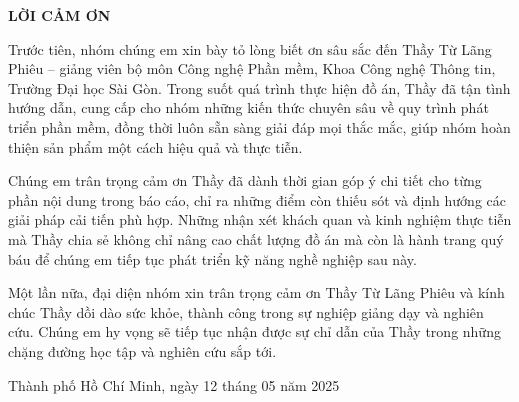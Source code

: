 \documentclass[a4paper]{article}
\begin{document}
\newpage
\begin{center}
\large\textbf{LỜI CẢM ƠN}
\end{center}

Trước tiên, nhóm chúng em xin bày tỏ lòng biết ơn sâu sắc đến Thầy Từ Lãng Phiêu – giảng viên bộ môn Công nghệ Phần mềm, Khoa Công nghệ Thông tin, Trường Đại học Sài Gòn. Trong suốt quá trình thực hiện đồ án, Thầy đã tận tình hướng dẫn, cung cấp cho nhóm những kiến thức chuyên sâu về quy trình phát triển phần mềm, đồng thời luôn sẵn sàng giải đáp mọi thắc mắc, giúp nhóm hoàn thiện sản phẩm một cách hiệu quả và thực tiễn.

Chúng em trân trọng cảm ơn Thầy đã dành thời gian góp ý chi tiết cho từng phần nội dung trong báo cáo, chỉ ra những điểm còn thiếu sót và định hướng các giải pháp cải tiến phù hợp. Những nhận xét khách quan và kinh nghiệm thực tiễn mà Thầy chia sẻ không chỉ nâng cao chất lượng đồ án mà còn là hành trang quý báu để chúng em tiếp tục phát triển kỹ năng nghề nghiệp sau này.

Một lần nữa, đại diện nhóm xin trân trọng cảm ơn Thầy Từ Lãng Phiêu và kính chúc Thầy dồi dào sức khỏe, thành công trong sự nghiệp giảng dạy và nghiên cứu. Chúng em hy vọng sẽ tiếp tục nhận được sự chỉ dẫn của Thầy trong những chặng đường học tập và nghiên cứu sắp tới.
\begin{flushright}
Thành phố Hồ Chí Minh, ngày 12 tháng 05 năm 2025
\end{flushright}
\newpage
\end{document}
